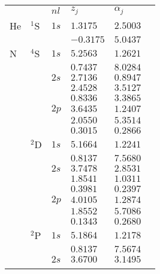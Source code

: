 \begin{table}
\begin{center}
\begin{tabular}{
>{\centering\arraybackslash}p{}
>{\centering\arraybackslash}p{}
>{\centering\arraybackslash}p{}
>{\raggedleft\arraybackslash}p{}
>{\raggedleft\arraybackslash}p{}
>{\centering\arraybackslash}p{}}
\rowcolor{mydarkgray} 
   &       & $nl$ & $z_j$        & $\alpha_j$  &  \\
He & $^1$S & $1s$ &  $1.3175$ & $2.5003$ & \\\rowcolor{mygray} 
   &       &      & $-0.3175$ & $5.0437$ & \\ 
N  & $^4$S & $1s$ & $5.2563$ & $1.2621$ & \\\rowcolor{mygray} 
   &       &      & $0.7437$ & $8.0284$ & \\ 
   &       & $2s$ & $2.7136$ & $0.8947$ & \\\rowcolor{mygray} 
   &       &      & $2.4528$ & $3.5127$ & \\
   &       &      & $0.8336$ & $3.3865$ & \\ \rowcolor{mygray} 
   &       & $2p$ & $3.6435$ & $1.2407$ & \\ 
   &       &      & $2.0550$ & $5.3514$ & \\\rowcolor{mygray} 
   &       &      & $0.3015$ & $0.2866$ & \\
   & $^2$D & $1s$ & $5.1664$ & $1.2241$ & \\\rowcolor{mygray} 
   &       &      & $0.8137$ & $7.5680$ & \\ 
   &       & $2s$ & $3.7478$ & $2.8531$ & \\\rowcolor{mygray} 
   &       &      & $1.8541$ & $1.0311$ & \\ 
   &       &      & $0.3981$ & $0.2397$ & \\\rowcolor{mygray} 
   &       & $2p$ & $4.0105$ & $1.2874$ & \\ 
   &       &      & $1.8552$ & $5.7086$ & \\\rowcolor{mygray} 
   &       &      & $0.1343$ & $0.2680$ & \\
   & $^2$P & $1s$ & $5.1864$ & $1.2178$ & \\\rowcolor{mygray} 
   &       &      & $0.8137$ & $7.5674$ & \\ 
   &       & $2s$ & $3.6700$ & $3.1495$ & \\\rowcolor{mygray} 

\end{tabular}
\end{center}
\end{table}
